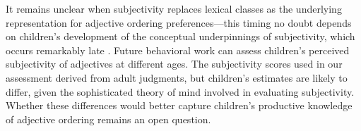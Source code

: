 \documentclass[10pt]{article}
\newcommand{\gcs}[1]{\textcolor{blue}{[gcs: #1]}}
\newcommand{\gkb}[1]{\textcolor{magenta}{[gkb: #1]}}
\newcommand{\lsp}[1]{\textcolor{violet}{[lsp: #1]}}
\begin{document}
It remains unclear when %
subjectivity replaces lexical classes as the underlying representation for adjective ordering preferences---this timing no doubt depends on children's development of the conceptual underpinnings of subjectivity, which occurs remarkably late \citep{fousheesrinivasan2017}. 
Future behavioral work can assess children's perceived subjectivity of adjectives at different ages. The subjectivity scores used in our assessment derived from adult judgments, but children's estimates are likely to differ, given the sophisticated theory of mind involved in evaluating subjectivity. %
Whether these differences would better capture children's productive knowledge of adjective ordering remains an open question.







\small %



\iffalse %
\small
\noindent \textbf{References}
\renewcommand{\section}[2]{} %

\renewcommand{\bibliographytypesize}{
\small
}

\fi
\end{document}
